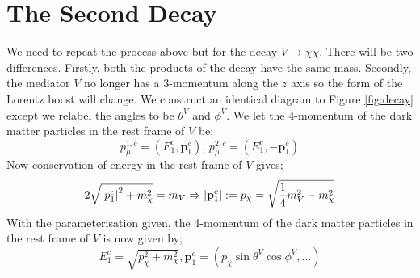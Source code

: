 \documentclass[10pt]{article}
\begin{document}
\section{The Second Decay}
We need to repeat the process above but for the decay $V \rightarrow \chi\chi$. There will be two differences. Firstly, both the products of the decay have the same mass. Secondly, the mediator $V$ no longer has a $3$-momentum along the $z$ axis so the form of the Lorentz boost will change. We construct an identical diagram to Figure \ref{fig:decay} except we relabel the angles to be $\theta^V$ and $\phi^V$. We let the $4$-momentum of the dark matter particles in the rest frame of $V$ be;
\begin{equation}
  p^{1,c}_\mu = (E_{1}^c, \mathbf{p}^c_{1}), \, p^{2,c}_\mu = (E_{1}^c, -\mathbf{p}^c_{1})
\end{equation}
Now conservation of energy in the rest frame of $V$ gives;
\begin{align}
  \label{eq:pchi}
  2\sqrt{\left| p_{1}^c \right|^2 + m_\chi^2} = m_V \Rightarrow \left| \mathbf{p}_{1}^c \right| := p_\chi = \sqrt{\frac{1}{4}m_V^2 - m_\chi^2}
\end{align}
With the parameterisation given, the 4-momentum of the dark matter particles in the rest frame of $V$ is now given by;
\begin{equation}
  E_{1}^c = \sqrt{p_\chi^2 + m_\chi^2}, \mathbf{p}^c_1 = (p_\chi\sin\theta^V\cos\phi^V, \ldots)
\end{equation}
\end{document}
